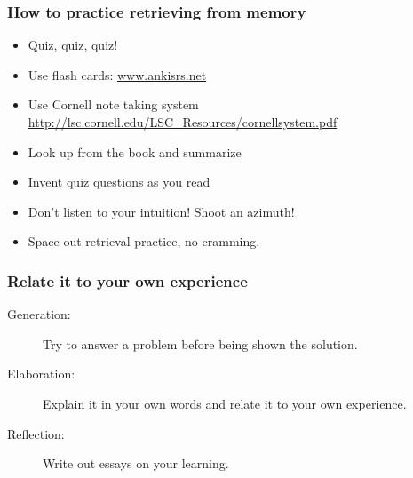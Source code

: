 \documentclass{beamer}
\newcommand{\bi}{\begin{itemize}}
\newcommand{\li}{\item}
\newcommand{\ei}{\end{itemize}}
\newcommand{\bfr}[1]{\begin{frame}[fragile]\frametitle{{ #1 }}}
\begin{document}
\bfr{How to practice retrieving from memory}
\bi
\li Quiz, quiz, quiz!
\li Use flash cards: \url{www.ankisrs.net}
\li Use Cornell note taking system \\\url{http://lsc.cornell.edu/LSC_Resources/cornellsystem.pdf}
\li Look up from the book and summarize
\li Invent quiz questions as you read
\ei
\bi
\li Don't listen to your intuition!  Shoot an azimuth!
\li Space out retrieval practice, no cramming.
\ei
\end{frame}

\bfr{Relate it to your own experience}

\begin{description}
\item[Generation:]
  Try to answer a problem before being shown the solution.
\item[Elaboration:]
  Explain it in your own words and relate it to your own experience.
\item[Reflection:] Write out essays on your learning.
\end{description}
\end{frame}
\end{document}
